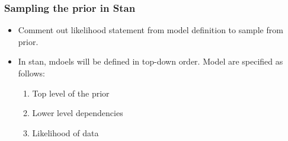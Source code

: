 \documentclass[a4paper]{article}
\begin{document}
\subsubsection{Sampling the prior in Stan}
\begin{itemize}
    \item Comment out likelihood statement from model definition to sample from prior.
    \item In stan, mdoels will be defined in top-down order. Model are specified as follows:
        \begin{enumerate}
            \item Top level of the prior
            \item Lower level dependencies
            \item Likelihood of data
        \end{enumerate}
\end{itemize}
\end{document}
